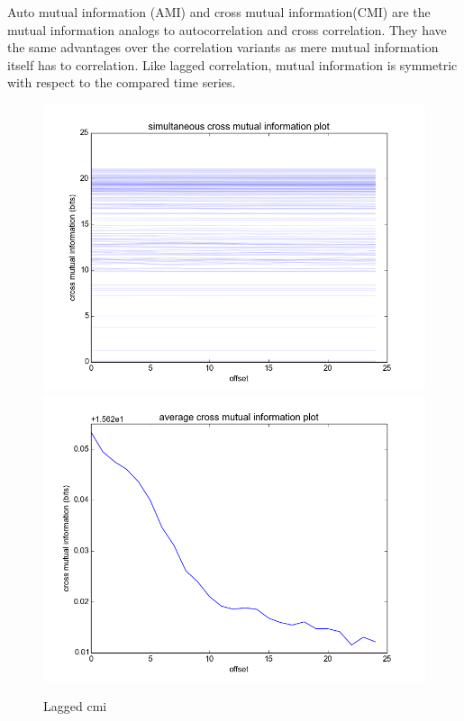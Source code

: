 \documentclass[12pt]{article}
\begin{document}
Auto mutual information (AMI) and cross mutual information(CMI) are the mutual information analogs to autocorrelation and cross correlation. They have the same advantages over the correlation variants as mere mutual information itself has to correlation. Like lagged correlation, mutual information is symmetric with respect to the compared time series.

\begin{figure}\label{fig:lag_cmi}
  \begin{center}
    \includegraphics[scale=0.4]{cmi_mc}
    \includegraphics[scale=0.4]{cmi_summary}
  \end{center}
  \caption{Lagged cmi}
\end{figure}
\end{document}
